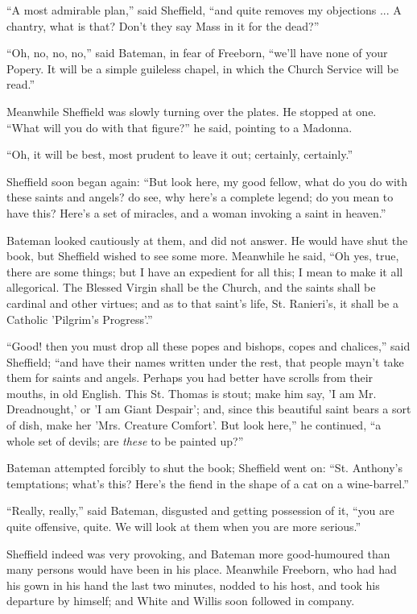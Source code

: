 ``A most admirable plan,'' said Sheffield, ``and quite
removes my objections ... A chantry, what is that? Don't they say Mass
in it for the dead?''

``Oh, no, no, no,'' said Bateman, in fear of Freeborn,
``we'll have none of your Popery. It will be a simple guileless
chapel, in which the Church Service will be read.''

Meanwhile Sheffield was slowly turning over the plates. He stopped
at one. ``What will you do with that figure?'' he said,
pointing to a Madonna.

``Oh, it will be best, most prudent to leave it out; certainly,
certainly.''

Sheffield soon began again: ``But look here, my good fellow,
what do you do with these saints and angels? do see, why here's a
complete legend; do you mean to have this? Here's a set of miracles,
and a woman invoking a saint in heaven.''

Bateman looked cautiously at them, and did not answer. He would
have shut the book, but Sheffield wished to see some more. Meanwhile
he said, ``Oh yes, true, there are some things; but I have an
expedient for all this; I mean to make it all allegorical. The Blessed
Virgin shall be the Church, and the saints shall be cardinal and other
virtues; and as to that saint's life, St. Ranieri's, it shall be a
Catholic 'Pilgrim's Progress'.''

``Good! then you must drop all these popes and bishops,
copes and chalices,'' said Sheffield; ``and have their names
written under the rest, that people mayn't take them for saints and
angels. Perhaps you had better have scrolls from their mouths, in old
English. This St. Thomas is stout; make him say, 'I am Mr.
Dreadnought,' or 'I am Giant Despair'; and, since this beautiful saint
bears a sort of dish, make her 'Mrs. Creature Comfort'. But look
here,'' he continued, ``a whole set of devils; are \emph{these}
to be painted up?''

Bateman attempted forcibly to shut the book; Sheffield went on:
``St. Anthony's temptations; what's this? Here's the fiend in the
shape of a cat on a wine-barrel.''

``Really, really,'' said Bateman, disgusted and getting
possession of it, ``you are quite offensive, quite. We will look
at them when you are more serious.''

Sheffield indeed was very provoking, and Bateman more good-humoured
than many persons would have been in his place. Meanwhile Freeborn,
who had had his gown in his hand the last two minutes, nodded to his
host, and took his departure by himself; and White and Willis soon
followed in company.

